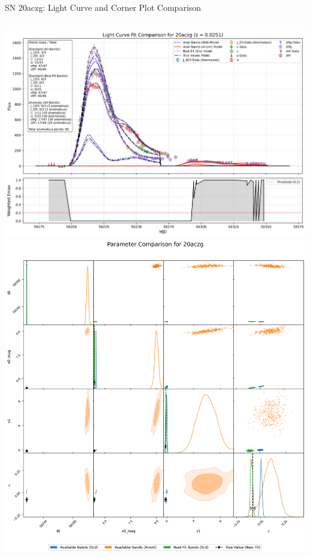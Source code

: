 \documentclass[aspectratio=169]{beamer}
\begin{document}
\begin{frame}{SN 20aczg: Light Curve and Corner Plot Comparison}
  \begin{columns}
    \includegraphics[width=\textwidth]{images/light_curve_comparison_20aczg.png}
    \includegraphics[width=\textwidth]{images/corner_comparison_20aczg.png}
  \end{columns}
\end{frame}
\end{document}
